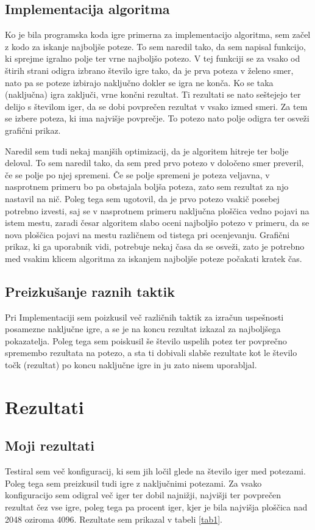 \documentclass[a4paper,11pt]{article}
\begin{document}
\subsection{Implementacija algoritma}
Ko je bila programska koda igre primerna za implementacijo algoritma, sem začel z kodo za iskanje najboljše poteze. To sem naredil tako, da sem napisal funkcijo, ki sprejme igralno polje ter vrne najboljšo potezo. V tej funkciji se za vsako od štirih strani odigra izbrano število igre tako, da je prva poteza v želeno smer, nato pa se poteze izbirajo naključno dokler se igra ne konča. Ko se taka (naključna) igra zaključi, vrne končni rezultat. Ti rezultati se nato seštejejo ter delijo s številom iger, da se dobi povprečen rezultat v vsako izmed smeri. Za tem se izbere poteza, ki ima najvišje povprečje. To potezo nato polje odigra ter osveži grafični prikaz.

Naredil sem tudi nekaj manjših optimizacij, da je algoritem hitreje ter bolje deloval. To sem naredil tako, da sem pred prvo potezo v določeno smer preveril, če se polje po njej spremeni. Če se polje spremeni je poteza veljavna, v nasprotnem primeru bo pa obstajala boljša poteza, zato sem rezultat za njo nastavil na nič. Poleg tega sem ugotovil, da je prvo potezo vsakič posebej potrebno izvesti, saj se v nasprotnem primeru naključna ploščica vedno pojavi na istem mestu, zaradi česar algoritem slabo oceni najboljšo potezo v primeru, da se nova ploščica pojavi na mestu različnem od tistega pri ocenjevanju. Grafični prikaz, ki ga uporabnik vidi, potrebuje nekaj časa da se osveži, zato je potrebno med vsakim klicem algoritma za iskanjem najboljše poteze počakati kratek čas. 

\subsection{Preizkušanje raznih taktik}
Pri Implementaciji sem poizkusil več različnih taktik za izračun uspešnosti posamezne naključne igre, a se je na koncu rezultat izkazal za najboljšega pokazatelja. Poleg tega sem poiskusil še število uspelih potez ter povprečno spremembo rezultata na potezo, a sta ti dobivali slabše rezultate kot le število točk (rezultat) po koncu naključne igre in ju zato nisem uporabljal.

\section{Rezultati}
\subsection{Moji rezultati}
Testiral sem več konfiguracij, ki sem jih ločil glede na število iger med potezami. Poleg tega sem preizkusil tudi igre z naključnimi potezami. Za vsako konfiguracijo sem odigral več iger ter dobil najnižji, najvišji ter povprečen rezultat čez vse igre, poleg tega pa procent iger, kjer je bila najvišja ploščica nad 2048 oziroma 4096. Rezultate sem prikazal v tabeli \ref{tab1}.
\end{document}
